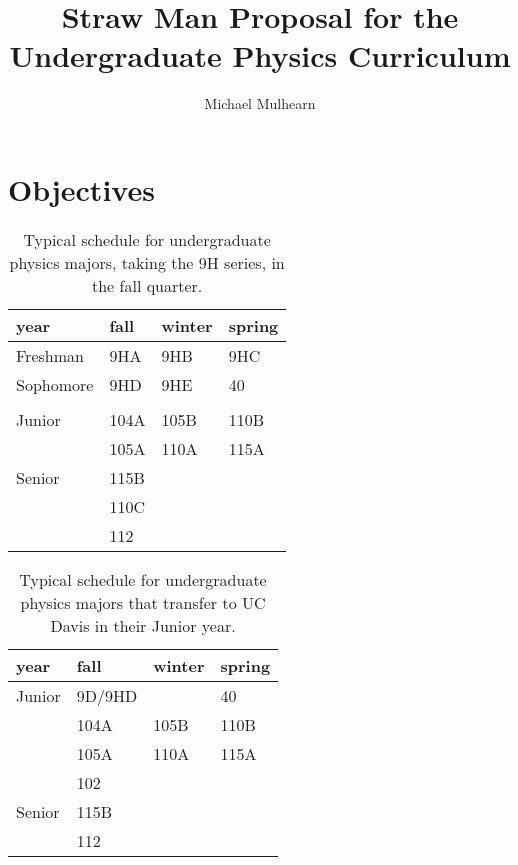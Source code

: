 \documentclass[12pt]{article}
\begin{document}

\title{Straw Man Proposal for the \\ Undergraduate Physics Curriculum}
\author{Michael Mulhearn}

\maketitle

\section{Objectives}

\begin{table}
\caption{Typical schedule for undergraduate physics majors, taking the 9H series, in the fall quarter.}
\label{tbl:current-honors}
\begin{center}
\begin{tabular}{|l|l|l|l|}
\hline
year      & fall    & winter & spring  \\
\hline
Freshman  & 9HA  & 9HB  & 9HC \\
\hline
Sophomore & 9HD  & 9HE   & 40     \\
          &      &        &        \\
\hline
Junior    & 104A & 105B & 110B\\
          & 105A & 110A & 115A\\
\hline
Senior    & 115B &        & \\
          & 110C &        & \\
          & 112  &        & \\

\hline 
\end{tabular}
\end{center}
\end{table}

\begin{table}
\caption{Typical schedule for undergraduate physics majors that transfer to UC Davis in their Junior year.}
\label{tbl:current-transfers}
\begin{center}
\begin{tabular}{|l|l|l|l|}
\hline
year      & fall    & winter & spring  \\
\hline
Junior    & 9D/9HD  &    & 40     \\
          & 104A & 105B & 110B\\
          & 105A & 110A & 115A\\
          & 102 &       & \\
\hline
Senior    & 115B &        & \\
          & 112  &        & \\
\hline 
\end{tabular}
\end{center}
\end{table}
\end{document}
